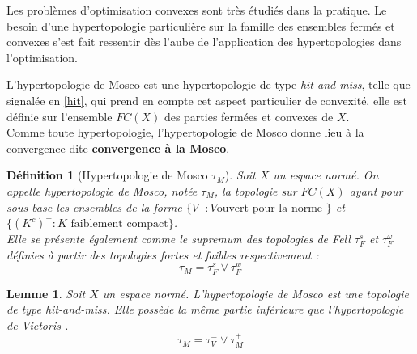 \documentclass[11pt]{report}
\newenvironment{boxtheorem}
{\begin{tcolorbox}
		[enhanced jigsaw,breakable,pad at break*=2mm,
		colback=black!5,colframe=bleueLeger]}
	{\end{tcolorbox}}
\newenvironment{boxdefinition}
{\begin{tcolorbox}
		[enhanced jigsaw,breakable,pad at break*=1mm,
		colback=black!5!white,boxrule=0pt,frame hidden,
		borderline west={1.5mm}{-2mm}{blue}]}
	{\end{tcolorbox}}
\theoremstyle{styletheorem}
\newtheorem{lemma}[theoreme]{Lemme}
\theoremstyle{styledef}
\newtheorem{definitions}[theoreme]{Définition}
\theoremstyle{remark}
\newenvironment{lemme}
{\vspace*{0.3cm}\begin{boxtheorem}\begin{lemma}}{\end{lemma}\end{boxtheorem}\vspace*{0.3cm}}
\newenvironment{definition}{\vspace*{0.3cm}\begin{boxdefinition}\begin{definitions}}{\end{definitions}\end{boxdefinition}\vspace*{0.3cm}}
\newcommand{\R}{\ensuremath{\mathbb{R}}}
\newcommand{\Fe}{\ensuremath{Fe_{\tau}(X)}}
\begin{document}
Les problèmes d'optimisation convexes sont très étudiés dans la pratique. Le besoin d'une hypertopologie particulière sur la famille des ensembles fermés et convexes s'est fait ressentir dès l'aube de l'application des hypertopologies dans l'optimisation.

L'hypertopologie de Mosco est une hypertopologie de type \emph{hit-and-miss}, telle que signalée en \ref{hit}, qui prend en compte cet aspect particulier de convexité, elle est définie sur l'ensemble $FC(X)$ des parties fermées et convexes de $X$.\\
Comme toute hypertopologie, l'hypertopologie de Mosco donne lieu à la convergence dite \textbf{convergence à la Mosco}.
\begin{definition}[Hypertopologie de Mosco $\tau_M$]
	Soit $X$ un espace normé. On appelle hypertopologie de Mosco, notée $\tau_M$, la topologie sur  $FC(X)$ ayant pour sous-base les ensembles de la forme $\lbrace V^- \colon V \text{ouvert pour la norme } \rbrace$ et $\lbrace (K^c)^+ \colon K \text{ faiblement compact} \rbrace$.\\
	Elle se présente également comme le supremum des topologies de Fell $\tau_F^s$ et $\tau_F^\omega$ définies à partir des topologies fortes et faibles respectivement : $$ \tau_M = \tau_F^s \vee \tau_F^w$$
\end{definition} 
\begin{lemme}
	Soit $X$ un espace normé. L'hypertopologie de Mosco est une topologie de type \emph{hit-and-miss}. Elle possède la même partie inférieure que l'hypertopologie de Vietoris \cite{b23}.
	$$\tau_M = \tau_V^- \vee \tau_M^+$$
\end{lemme}


	
\end{document}
